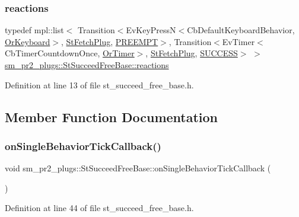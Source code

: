 \subsubsection{\texorpdfstring{reactions}{reactions}}
{\footnotesize\ttfamily typedef mpl\+::list$<$ Transition$<$Ev\+Key\+PressN$<$Cb\+Default\+Keyboard\+Behavior, \hyperlink{classsm__pr2__plugs_1_1OrKeyboard}{Or\+Keyboard}$>$, \hyperlink{structsm__pr2__plugs_1_1StFetchPlug}{St\+Fetch\+Plug}, \hyperlink{classPREEMPT}{P\+R\+E\+E\+M\+PT}$>$, Transition$<$Ev\+Timer$<$Cb\+Timer\+Countdown\+Once, \hyperlink{classsm__pr2__plugs_1_1OrTimer}{Or\+Timer}$>$, \hyperlink{structsm__pr2__plugs_1_1StFetchPlug}{St\+Fetch\+Plug}, \hyperlink{classSUCCESS}{S\+U\+C\+C\+E\+SS}$>$ $>$ \hyperlink{structsm__pr2__plugs_1_1StSucceedFreeBase_a14771e3fa3c17d96f2b8c3f6f39089ec}{sm\+\_\+pr2\+\_\+plugs\+::\+St\+Succeed\+Free\+Base\+::reactions}}



Definition at line 13 of file st\+\_\+succeed\+\_\+free\+\_\+base.\+h.



\subsection{Member Function Documentation}
\mbox{\label{structsm__pr2__plugs_1_1StSucceedFreeBase_a18e063dd7dc924cd903824eaa2b680f7}} 
\subsubsection{\texorpdfstring{on\+Single\+Behavior\+Tick\+Callback()}{onSingleBehaviorTickCallback()}}
{\footnotesize\ttfamily void sm\+\_\+pr2\+\_\+plugs\+::\+St\+Succeed\+Free\+Base\+::on\+Single\+Behavior\+Tick\+Callback (\begin{DoxyParamCaption}{ }\end{DoxyParamCaption})\hspace{0.3cm}{\ttfamily [inline]}}



Definition at line 44 of file st\+\_\+succeed\+\_\+free\+\_\+base.\+h.



